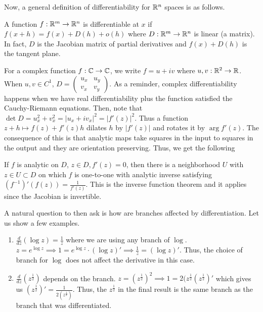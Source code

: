 \documentclass[11pt,leqno,oneside]{amsart}
\begin{document}
    Now, a general definition of differentiability for ${\mathbb R}^n$ spaces is as
    follows.
    \begin{defn}
        A function $f: {\mathbb R}^m \to {\mathbb R}^n$ is differentiable at $x$ if $f(x+h) =
        f(x)+D(h)+o(h)$ where $D: {\mathbb R}^m \to {\mathbb R}^n$ is linear (a matrix). In fact,
        $D$ is the Jacobian matrix of partial derivatives and $f(x)+D(h)$ is
        the tangent plane.
    \end{defn}
    For a complex function $f: {\mathbb C} \to {\mathbb C}$, we write $f = u+iv$ where $u,v: {\mathbb R}^2
    \to {\mathbb R}$. When $u,v \in C^1$, $D = \left( \begin{array}{cc}
        u_x & u_y \\
        v_x & v_y
    \end{array}\right)$. As a reminder, complex differentiability happens when
    we have real differentiability plus the function satisfied the
    Cauchy-Riemann equations. Then, note that $\det D = u_x^2 + v_x^2 =
    |u_x+iv_x|^2 = |f'(z)|^2$. Thus a function $z+h \mapsto f(z) + f'(z)h$
    dilates $h$ by $|f'(z)|$ and rotates it by $\arg f'(z)$. The consequence of
    this is that analytic maps take squares in the input to squares in the
    output and they are orientation preserving. Thus, we get the following
    \begin{rmk}
        If $f$ is analytic on $D$, $z \in D, f'(z) = 0$, then there is a
        neighborhood $U$ with $z \in U \subset D$ on which $f$ is one-to-one
        with analytic inverse satisfying $(f^{-1})'(f(z)) = \frac{1}{f'(z)}$.
        This is the inverse function theorem and it applies since the Jacobian
        is invertible.
    \end{rmk}
    A natural question to then ask is how are branches affected by
    differentiation. Let us show a few examples.
    \begin{example}
        \begin{enumerate}
            \item $\frac{d}{dz}(\log z) = \frac{1}{z}$ where we are using any
                branch of $\log$. $z = e^{\log z} \implies 1 = e^{\log z} \cdot
                (\log z)' \implies \frac{1}{z} = (\log z)'$. Thus, the choice
                of branch for $\log$ does not affect the derivative in this
                case.
            \item $\frac{d}{dz}(z^{\frac{1}{2}})$ depends on the branch. $z =
                (z^{\frac{1}{2}})^2 \implies 1 =
                2(z^{\frac{1}{2}}(z^{\frac{1}{2}})'$ which gives us
                $(z^{\frac{1}{2}})' = \frac{1}{2(z^\frac{1}{2})}$. Thus, the
                $z^\frac{1}{2}$ in the final result is the same branch as the
                branch that was differentiated.
        \end{enumerate}
    \end{example}
\end{document}
